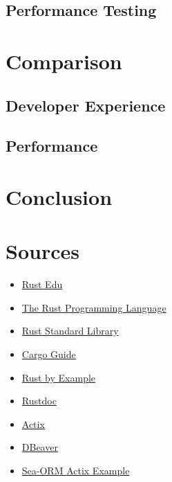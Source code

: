 \documentclass[a4paper,12pt]{article}
\begin{document}
	\subsection{Performance Testing}
	\label{subsec:performance_testing}

	\section{Comparison}
	\label{sec:comparison}
	\subsection{Developer Experience}
	\subsection{Performance}
	
	\section{Conclusion}

	\newpage
	\section{Sources}
	\label{sec:Sources}
	\begin{itemize}
		\item \href{https://rust-edu.org/resources/}{Rust Edu}
		\item \href{https://doc.rust-lang.org/book/}{The Rust Programming Language}
		\item \href{https://doc.rust-lang.org/std/}{Rust Standard Library}
		\item \href{https://doc.rust-lang.org/cargo/}{Cargo Guide}
		\item \href{https://doc.rust-lang.org/rust-by-example/}{Rust by Example}
		\item \href{https://doc.rust-lang.org/rustdoc/}{Rustdoc}
		\item \href{https://actix.rs/}{Actix}
		\item \href{https://dbeaver.io/}{DBeaver}
		\item \href{https://github.com/SeaQL/sea-orm/tree/master/examples/actix_example}{Sea-ORM Actix Example}
	\end{itemize}
	\printbibliography[title={Whole bibliography}]
\end{document}
